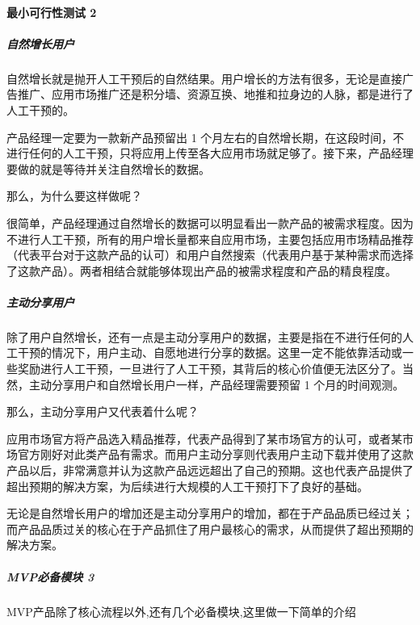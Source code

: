 \documentclass[letterpaper,10pt,english]{sphinxmanual}
\begin{document}
\paragraph{最小可行性测试 2\sphinxfootnotemark[637]}
\label{\detokenize{chapter_knowledge/MVP:id1}}%
\begin{footnotetext}[637]\sphinxAtStartFootnote
{}
%
\end{footnotetext}\ignorespaces 

\subparagraph{自然增长用户}
\label{\detokenize{chapter_knowledge/MVP:id2}}
自然增长就是抛开人工干预后的自然结果。用户增长的方法有很多，无论是直接广告推广、应用市场推广还是积分墙、资源互换、地推和拉身边的人脉，都是进行了人工干预的。

产品经理一定要为一款新产品预留出 1
个月左右的自然增长期，在这段时间，不进行任何的人工干预，只将应用上传至各大应用市场就足够了。接下来，产品经理要做的就是等待并关注自然增长的数据。

那么，为什么要这样做呢？

很简单，产品经理通过自然增长的数据可以明显看出一款产品的被需求程度。因为不进行人工干预，所有的用户增长量都来自应用市场，主要包括应用市场精品推荐（代表平台对于这款产品的认可）和用户自然搜索（代表用户基于某种需求而选择了这款产品）。两者相结合就能够体现出产品的被需求程度和产品的精良程度。


\subparagraph{主动分享用户}
\label{\detokenize{chapter_knowledge/MVP:id3}}
除了用户自然增长，还有一点是主动分享用户的数据，主要是指在不进行任何的人工干预的情况下，用户主动、自愿地进行分享的数据。这里一定不能依靠活动或一些奖励进行人工干预，一旦进行了人工干预，其背后的核心价值便无法区分了。当然，主动分享用户和自然增长用户一样，产品经理需要预留
1 个月的时间观测。

那么，主动分享用户又代表着什么呢？

应用市场官方将产品选入精品推荐，代表产品得到了某市场官方的认可，或者某市场官方刚好对此类产品有需求。而用户主动分享则代表用户主动下载并使用了这款产品以后，非常满意并认为这款产品远远超出了自己的预期。这也代表产品提供了超出预期的解决方案，为后续进行大规模的人工干预打下了良好的基础。

无论是自然增长用户的增加还是主动分享用户的增加，都在于产品品质已经过关；而产品品质过关的核心在于产品抓住了用户最核心的需求，从而提供了超出预期的解决方案。


\subparagraph{MVP必备模块 3\sphinxfootnotemark[638]}
\label{\detokenize{chapter_knowledge/MVP:mvp-3}}%
\begin{footnotetext}[638]\sphinxAtStartFootnote
{}
%
\end{footnotetext}\ignorespaces 
MVP产品除了核心流程以外,还有几个必备模块,这里做一下简单的介绍
\end{document}
